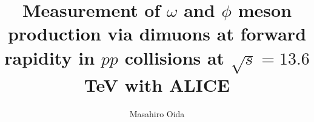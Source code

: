 \documentclass[12pt,a4paper,titlepage]{article}
\title{Measurement of $\omega$ and $\phi$ meson production via dimuons at forward rapidity in $pp$ collisions at $\sqrt{s}=13.6$ TeV with ALICE}
\date{}
\author{Masahiro Oida}
\begin{document}
    \maketitle
    \setcounter{tocdepth}{3}
    \tableofcontents
    \newpage
    \setcounter{section}{0}

    
    
    
    
    
    \begin{thebibliography}{99}
        
    \end{thebibliography}
\end{document}
